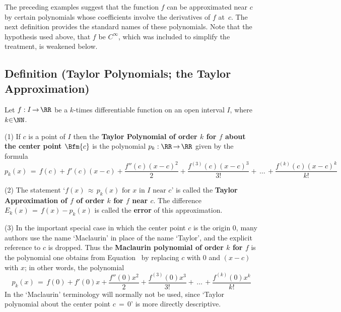 {\VV

        The preceding examples suggest that the function $f$
    can be approximated near $c$ by certain polynomials whose coefficients involve the derivatives of $f$ at~$c$.
    The next definition provides the standard names of these polynomials. Note that the hypothesis used above,
    that $f$ be $C^{{\infty}}$, which was included to simplify the treatment, is weakened below.

\V

            \subsection{\small{\bf Definition} (Taylor Polynomials; the Taylor Approximation)}
            \label{DefE60.20}

        Let $f:I \,{\rightarrow}\, {\RR}$ be a $k$-times differentiable function on an open interval $I$, where $k{\in}{\NN}$.

\V

        (1) If $c$ is a point of $I$ then the {\bf Taylor Polynomial of order $k$ for $f$ about the center point $\Bfm{c}$}
    is the polynomial $p_{k}:{\RR} \,{\rightarrow}\, {\RR}$ given by the formula
        \begin{equation}
        \label{EqnE.120A}
        p_{k}(x) \,=\, f(c) + f'(c)(x-c) + \frac{f''(c)(x-c)^{2}}{2} + \frac{f^{(3)}(c)(x-c)^{3}}{3!} + \,{\ldots}\,+ \frac{f^{(k)}(c)(x-c)^{k}}{k!}
        \end{equation}

\V

        (2) The statement `$f(x) \,{\approx}\, p_{k}(x) \mbox{ for $x$ in $I$ near $c$}$'
    is called the {\bf Taylor Approximation of $f$ of order $k$ for $f$ near $c$}.
    The difference $E_{k}(x) \,=\, f(x) - p_{k}(x)$ is called the {\bf error} of this approximation.

\V

        (3) In the important special case in which the center point $c$ is the origin $0$, many authors use the name `Maclaurin' in place of the name `Taylor',
    and the explicit reference to $c$ is dropped. Thus the {\bf Maclaurin polynomial of order $k$ for $f$}
    is the polynomial one obtains from Equation~ by replacing $c$ with $0$ and $(x-c)$ with $x$; in other words, the polynomial
        \begin{equation}
        \label{EqnE.120B}
        p_{k}(x) \,=\, f(0) + f'(0)x + \frac{f''(0)x^{2}}{2} + \frac{f^{(3)}(0)x^{3}}{3!} + \,{\ldots}\,+ \frac{f^{(k)}(0)x^{k}}{k!}
        \end{equation}
    In {\ThisText} the `Maclaurin' terminology will normally not be used, since `Taylor polynomial about the center point $c \,=\, 0$'
    is more directly descriptive.

}
